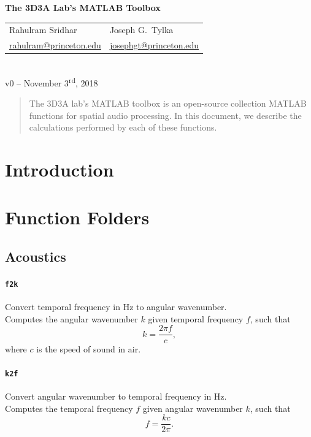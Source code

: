 \documentclass[11pt, oneside]{article}
\newcommand{\function}[1]{\paragraph*{\texttt{#1}}}
\begin{document}
\begin{centering}
{\Large \textbf{The 3D3A Lab's MATLAB Toolbox}}\\
\vspace{\baselineskip}
\begin{tabular}{CC}
    Rahulram Sridhar & Joseph G.~Tylka \\
    \href{mailto:rahulram@princeton.edu}{rahulram@princeton.edu} & \href{mailto:josephgt@princeton.edu}{josephgt@princeton.edu}
\end{tabular}\\
\vspace{\baselineskip}
v0 -- November 3\textsuperscript{rd}, 2018\\
\end{centering}

\begin{abstract}
The 3D3A lab's MATLAB toolbox is an open-source collection MATLAB functions for spatial audio processing.
In this document, we describe the calculations performed by each of these functions.
\end{abstract}

\section{Introduction}


\section{Function Folders}

\subsection{Acoustics}

\function{f2k} Convert temporal frequency in Hz to angular wavenumber. \\
Computes the angular wavenumber $k$ given temporal frequency $f$, such that
\begin{equation}
k = \frac{2 \pi f}{c},
\end{equation}
where $c$ is the speed of sound in air.

\function{k2f} Convert angular wavenumber to temporal frequency in Hz. \\
Computes the temporal frequency $f$ given angular wavenumber $k$, such that
\begin{equation}
f = \frac{k c}{2 \pi}.
\end{equation}
\end{document}
